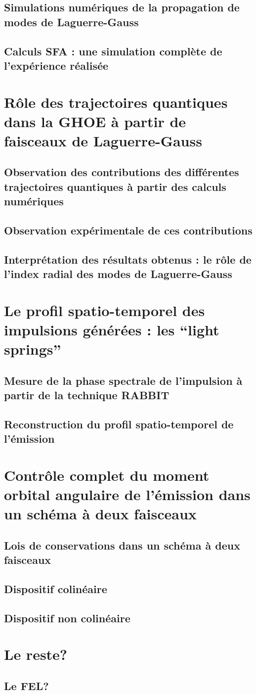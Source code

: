 \subsection{Simulations numériques de la propagation de modes de Laguerre-Gauss}
\subsection{Calculs SFA : une simulation complète de l'expérience réalisée}

\section{Rôle des trajectoires quantiques dans la GHOE à partir de faisceaux de Laguerre-Gauss}
\subsection{Observation des contributions des différentes trajectoires quantiques à partir des calculs numériques}
\subsection{Observation expérimentale de ces contributions}
\subsection{Interprétation des résultats obtenus : le rôle de l'index radial des modes de Laguerre-Gauss}

\section{Le profil spatio-temporel des impulsions générées : les ``light springs''}
\subsection{Mesure de la phase spectrale de l'impulsion à partir de la technique RABBIT}
\subsection{Reconstruction du profil spatio-temporel de l'émission}

\section{Contrôle complet du moment orbital angulaire de l'émission dans un schéma à deux faisceaux}
\subsection{Lois de conservations dans un schéma à deux faisceaux}
\subsection{Dispositif colinéaire}
\subsection{Dispositif non colinéaire}

\section{Le reste?}
\subsection{Le FEL?}